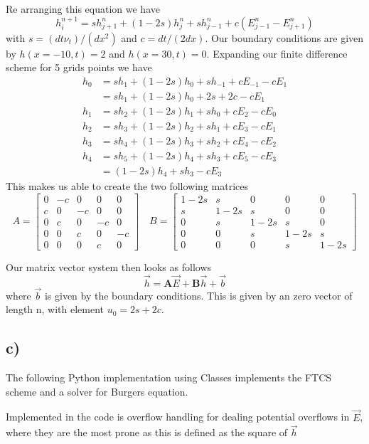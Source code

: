 \documentclass[10pt, a4paper]{amsart}
\begin{document}
Re arranging this equation we have 
\begin{equation}
	h_i^{n+1} = sh_{j+1}^n + (1-2s)h_j^n + sh_{j-1}^n + c(E_{j-1}^n - E_{j+1}^n)
\end{equation}
with $s = (dt\nu_t)/(dx^2)$ and $c = dt/(2dx)$.
Our boundary conditions are given by $h(x=-10,t) = 2$ and $h(x=30, t) = 0$. Expanding our finite difference scheme for 5 grids points we have 
\begin{align}
	h_0 &= sh_1 + (1-2s)h_0 + sh_{-1} + cE_{-1} - cE_1\\
	&= sh_1 + (1-2s)h_0 + 2s + 2c - cE_1\\
	h_1 &= sh_2 + (1-2s)h_1 + sh_0 + cE_2 - cE_0\\
	h_2 &= sh_3 + (1-2s)h_2 + sh_1 + cE_3 - cE_1\\
	h_3 &= sh_4 + (1-2s)h_3 + sh_2 + cE_4 - cE_2\\
	h_4 &= sh_5 + (1-2s)h_4 + sh_3 + cE_5 - cE_3\\
	&= (1-2s)h_4 + sh_3 - cE_3
\end{align}
This makes us able to create the two following matrices
\begin{equation}
	A = 
	\begin{bmatrix}
		0 & -c & 0 & 0 & 0\\
		c & 0 & -c & 0 & 0\\
		0 & c & 0 & -c & 0\\
		0 & 0 & c & 0 & -c\\
		0 & 0 & 0 & c & 0 
	\end{bmatrix}
\quad 
B = 
\begin{bmatrix}
	1-2s & s & 0 & 0 & 0\\
	s & 1-2s & s & 0 & 0\\
	0 & s & 1-2s & s & 0\\
	0 & 0 & s & 1-2s & s\\
	0 & 0 & 0 & s & 1-2s
\end{bmatrix}
\end{equation}

Our matrix vector system then looks as follows 
\begin{equation}
	\vec{h} = \mathbf{A}\vec{E} + \mathbf{B}\vec{h} + \vec{b}
\end{equation}
where $\vec{b}$ is given by the boundary conditions. This is given by an zero vector of length n, with element $u_0 = 2s+2c$.

\subsection{c)}
The following Python implementation using Classes implements the FTCS scheme and a solver for Burgers equation.

Implemented in the code is overflow handling for dealing potential overflows in $\vec{E}$, where they are the most prone as this is defined as the square of $\vec{h}$
\end{document}
